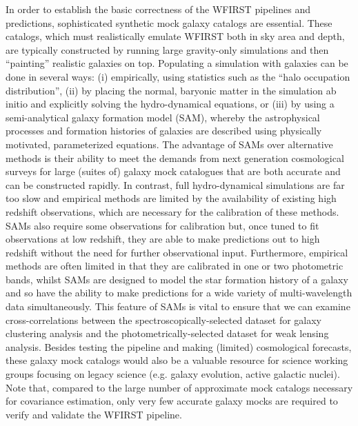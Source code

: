  In order to establish the basic correctness of the WFIRST pipelines and
 predictions, sophisticated synthetic mock galaxy catalogs are essential.
 These catalogs, which must realistically emulate WFIRST both in sky area and
 depth, are typically constructed by running large gravity-only simulations and
 then ``painting'' realistic galaxies on top.  Populating a simulation with
 galaxies can be done in several ways: (i) empirically, using statistics such as
 the ``halo occupation distribution'', (ii) by placing the normal, baryonic matter
 in the simulation ab initio and explicitly solving the hydro-dynamical
 equations, or (iii) by using a semi-analytical galaxy formation model (SAM),
 whereby the astrophysical processes and formation histories of galaxies are
 described using physically motivated, parameterized equations. The advantage of
 SAMs over alternative methods is their ability to meet the demands from next
 generation cosmological surveys for large (suites of) galaxy mock catalogues
 that are both accurate and can be constructed rapidly. In contrast, full
 hydro-dynamical simulations are far too slow and empirical methods are limited
 by the availability of existing high redshift observations, which are necessary
 for the calibration of these methods. SAMs also require some observations for
 calibration but, once tuned to fit observations at low redshift, they are able
 to make predictions out to high redshift without the need for further
 observational input. Furthermore, empirical methods are often limited in that
 they are calibrated in one or two photometric bands, whilst SAMs are designed to
 model the star formation history of a galaxy and so have the ability to make
 predictions for a wide variety of multi-wavelength data simultaneously. This
 feature of SAMs is vital to ensure that we can examine cross-correlations
 between the spectroscopically-selected dataset for galaxy clustering analysis
 and the photometrically-selected dataset for weak lensing analysis. Besides
 testing the pipeline and making (limited) cosmological forecasts, these galaxy
 mock catalogs would also be a valuable resource for science working groups
 focusing on legacy science (e.g. galaxy evolution, active galactic nuclei). Note
 that,  compared to the large number of approximate mock catalogs necessary for
 covariance estimation, only very few accurate galaxy mocks are required to
 verify and validate the WFIRST pipeline.


